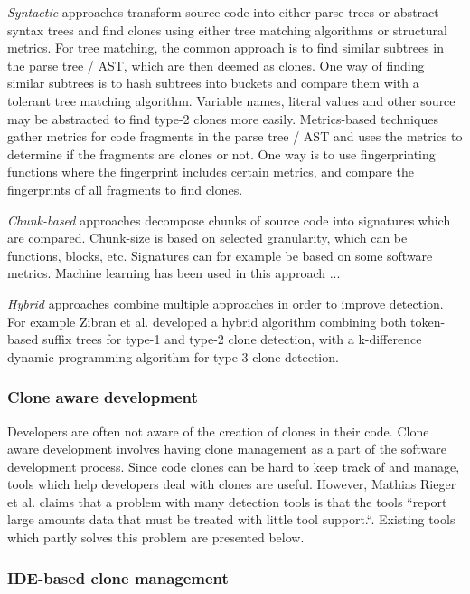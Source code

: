 \documentclass[12pt]{article}
\begin{document}
\textit{Syntactic} approaches transform source code into either parse trees or abstract
syntax trees and find clones using either tree matching algorithms or structural metrics.
For tree matching, the common approach is to find similar subtrees in the parse tree /
AST, which are then deemed as clones. One way of finding similar subtrees is to hash
subtrees into buckets and compare them with a tolerant tree matching algorithm. Variable
names, literal values and other source may be abstracted to find type-2 clones more
easily. Metrics-based techniques gather metrics for code fragments in the parse tree / AST
and uses the metrics to determine if the fragments are clones or not. One way is to use
fingerprinting functions where the fingerprint includes certain metrics, and compare the
fingerprints of all fragments to find clones.

\textit{Chunk-based} approaches decompose chunks of source code into signatures which are
compared. Chunk-size is based on selected granularity, which can be functions, blocks,
etc. Signatures can for example be based on some software metrics. Machine learning has
been used in this approach ...

\textit{Hybrid} approaches combine multiple approaches in order to improve detection. For
example Zibran et al.\cite{Zibran_real_time_search} developed a hybrid algorithm
combining both token-based suffix trees for type-1 and type-2 clone detection, with
a k-difference dynamic programming algorithm for type-3 clone detection.


\subsubsection{Clone aware development}

Developers are often not aware of the creation of clones in their code. Clone aware
development involves having clone management as a part of the software development
process. Since code clones can be hard to keep track of and manage, tools which help
developers deal with clones are useful. However, Mathias Rieger et al. claims that
a problem with many detection tools is that the tools ``report large amounts data that must
be treated with little tool support.``\cite[1]{InsightsSystemWideDuplication}. Existing
tools which partly solves this problem are presented below.

\subsubsection{IDE-based clone management}
\end{document}

